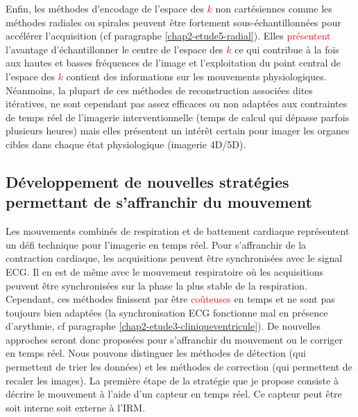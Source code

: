 Enfin, les méthodes d’encodage de l’espace des \textcolor{red}{$k$} non cartésiennes comme les méthodes radiales ou spirales \cite{wright20143d} peuvent être fortement sous-échantillonnées pour accélérer l’acquisition (cf paragraphe \ref{chap2-etude5-radial}). Elles \textcolor{red}{présentent} l’avantage d’échantillonner le centre de l’espace des \textcolor{red}{$k$} ce qui contribue à la fois aux hautes et basses fréquences de l’image et l’exploitation du point central de l’espace des \textcolor{red}{$k$} contient des informations sur les mouvements physiologiques. Néanmoins, la plupart de ces méthodes de reconstruction associées dites itératives, \cite{lustig2007sparse} ne sont cependant pas assez efficaces ou non adaptées aux contraintes de temps réel de l’imagerie interventionnelle (temps de calcul qui dépasse parfois plusieurs heures) mais elles présentent un intérêt certain pour imager les organes cibles dans chaque état physiologique (imagerie 4D/5D).

\subsection{Développement de nouvelles stratégies permettant de s'affranchir du mouvement}

Les mouvements combinés de respiration et de battement cardiaque représentent un défi technique pour l’imagerie en temps réel. Pour s’affranchir de la contraction cardiaque, les acquisitions peuvent être synchronisées avec le signal \ac{ECG}. Il en est de même avec le mouvement respiratoire où les acquisitions peuvent être synchronisées sur la phase la plus stable de la respiration. Cependant, ces méthodes finissent par être \textcolor{red}{coûteuses} en temps et ne sont pas toujours bien adaptées (la synchronisation ECG fonctionne mal en présence d’arythmie, cf paragraphe \ref{chap2-etude3-cliniqueventricule}). De nouvelles approches seront donc proposées pour s’affranchir du mouvement ou le corriger en temps réel. Nous pouvons distinguer les méthodes de détection (qui permettent de trier les données) et les méthodes de correction (qui permettent de recaler les images). La première étape de la stratégie que je propose consiste à décrire le mouvement à l’aide d'un capteur en temps réel. Ce capteur peut être soit interne soit externe à l’IRM.